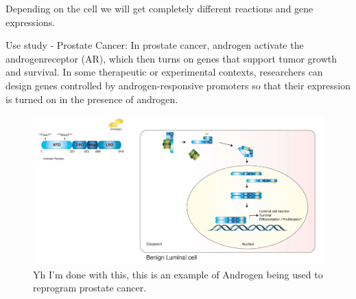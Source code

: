 \documentclass[../main.tex]{subfiles}
\begin{document}
Depending on the cell we will get completely different reactions and gene expressions.

\begin{RemarkWithTitel}{Use study - Prostate Cancer:}
	In prostate cancer, \gls{androgen} activate the \gls{androgenreceptor} (AR), which then turns on genes that support tumor growth and survival. In some therapeutic or experimental contexts, researchers can design genes controlled by androgen-responsive promoters so that their expression is turned on in the presence of androgen.
\end{RemarkWithTitel}

\begin{figure}[H]
	\centering
	\includegraphics[width=0.7\linewidth]{Nuc_foff}
	\caption{Yh I'm done with this, this is an example of Androgen being used to reprogram prostate cancer.}
\end{figure}
\end{document}
